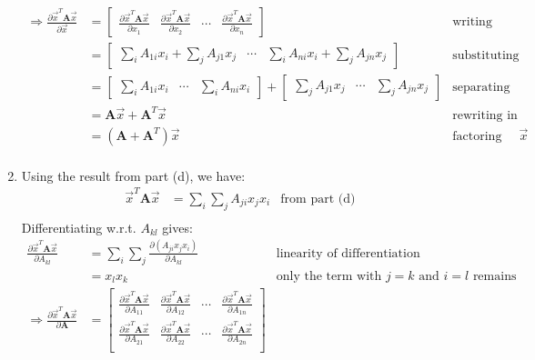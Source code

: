 \documentclass[11pt, fleqn]{article}
\newcommand{\pd}[2]{\frac{\partial #1}{\partial #2}}
\begin{document}
\begin{enumerate}
\begin{align*}
        \Rightarrow \pd{\vec{x}^T \textbf{A} \vec{x}}{\vec{x}} &= \begin{bmatrix}
            \pd{\vec{x}^T \textbf{A} \vec{x}}{x_1} & \pd{\vec{x}^T \textbf{A} \vec{x}}{x_2} & \cdots & \pd{\vec{x}^T \textbf{A} \vec{x}}{x_n}
        \end{bmatrix} & \text{writing derivative in vector form} \\
        &= \begin{bmatrix}
            \sum_{i} A_{1i} x_i + \sum_{j} A_{j1} x_j & \cdots & \sum_{i} A_{ni} x_i + \sum_{j} A_{jn} x_j
        \end{bmatrix} & \text{substituting previous result} \\
        &= \begin{bmatrix}
            \sum_{i} A_{1i} x_i & \cdots & \sum_{i} A_{ni} x_i
        \end{bmatrix} + \begin{bmatrix}
            \sum_{j} A_{j1} x_j & \cdots & \sum_{j} A_{jn} x_j
        \end{bmatrix} & \text{separating the sums} \\
        &= \textbf{A} \vec{x} + \textbf{A}^T \vec{x} & \text{rewriting in matrix form} \\
        &= (\textbf{A} + \textbf{A}^T) \vec{x} & \text{factoring out } \vec{x} \\
    \end{align*}
    \item Using the result from part (d), we have:
    \begin{align*}
        \vec{x}^T \textbf{A} \vec{x} &= \sum_{i} \sum_{j} A_{ji} x_j x_i & \text{from part (d)} \\
    \end{align*}
    Differentiating w.r.t. $A_{kl}$ gives:
    \begin{align*}
        \pd{\vec{x}^T \textbf{A} \vec{x}}{A_{kl}} &= \sum_{i} \sum_{j} \pd{(A_{ji} x_j x_i)}{A_{kl}} & \text{linearity of differentiation} \\
        &= x_l x_k & \text{only the term with } j = k \text{ and } i = l \text{ remains} \\
        \Rightarrow \pd{\vec{x}^T \textbf{A} \vec{x}}{\textbf{A}} &= \begin{bmatrix}
            \pd{\vec{x}^T \textbf{A} \vec{x}}{A_{11}} & \pd{\vec{x}^T \textbf{A} \vec{x}}{A_{12}} & \cdots & \pd{\vec{x}^T \textbf{A} \vec{x}}{A_{1n}} \\
            \pd{\vec{x}^T \textbf{A} \vec{x}}{A_{21}} & \pd{\vec{x}^T \textbf{A} \vec{x}}{A_{22}} & \cdots & \pd{\vec{x}^T \textbf{A} \vec{x}}{A_{2n}} \\

\end{bmatrix}
\end{align*}
\end{enumerate}
\end{document}
